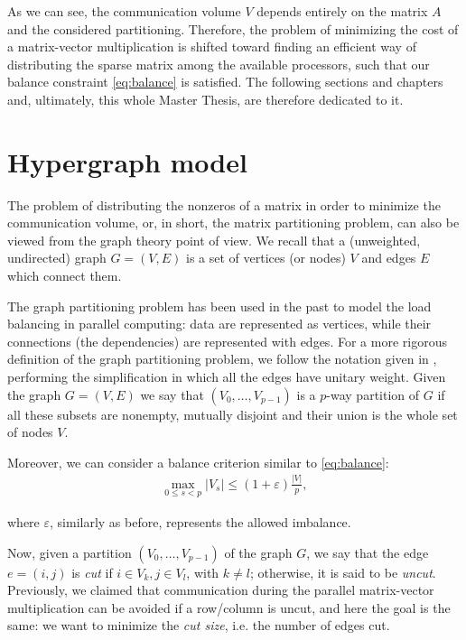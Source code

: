 As we can see, the communication volume $V$ depends entirely on the matrix $A$ and the considered partitioning. Therefore, the problem of minimizing the cost of a matrix-vector multiplication is shifted toward finding an efficient way of distributing the sparse matrix among the available processors, such that our balance constraint \eqref{eq:balance} is satisfied. The following sections and chapters and, ultimately, this whole Master Thesis, are therefore dedicated to it.

\section{Hypergraph model}

The problem of distributing the nonzeros of a matrix in order to minimize the communication volume, or, in short, the matrix partitioning problem, can also be viewed from the graph theory point of view. We recall that a (unweighted, undirected) graph $G=(V,E)$ is a set of vertices (or nodes) $V$ and edges $E$ which connect them. 

The graph partitioning problem has been used in the past to model the load balancing in parallel computing: data are represented as vertices, while their connections (the dependencies) are represented with edges. For a more rigorous definition of the graph partitioning problem, we follow the notation given in \cite{hypergraph_model},  performing the simplification in which all the edges have unitary weight. Given the graph $G=(V,E)$ we say that $(V_0,\dots,V_{p-1})$ is a $p$-way partition of $G$ if all these subsets are nonempty, mutually disjoint and their union is the whole set of nodes $V$. 

Moreover, we can consider a balance criterion similar to \eqref{eq:balance}:
\begin{align}
	\max_{0\leq s <p}	|V_s| \leq (1+\varepsilon)\frac{|V|}{p},
	\label{eq:balance_hypergraph}
\end{align}

where $\varepsilon$, similarly as before, represents the allowed imbalance.

Now, given a partition $(V_0,\dots,V_{p-1})$ of the graph $G$, we say that the edge $e=(i,j)$ is \emph{cut} if $i \in V_k, j \in V_l$, with $k \neq l$; otherwise, it is said to be \emph{uncut}. Previously, we claimed that communication during the parallel matrix-vector multiplication can be avoided if a row/column is uncut, and here the goal is the same: we want to minimize the \emph{cut size}, i.e. the number of edges cut.

